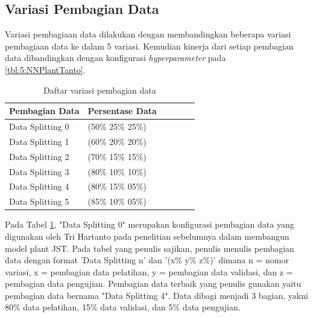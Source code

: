 
\subsection{Variasi Pembagian Data} 

Variasi pembagiaan data dilakukan dengan membandingkan beberapa variasi pembagiaan data ke dalam 5 variasi. Kemudian kinerja dari setiap pembagian data dibandingkan dengan konfigurasi \textit{hyperparameter} pada \ref{tbl:5:NNPlantTanto}.

\begin{table}[h!]
	\caption{Daftar variasi pembagian data}
	\label{tbl:5:DataSplitting}
	\centering
	\begin{tabular}{|p{3cm}|p{3cm}|p{1.5cm}|p{1cm}|p{1.5cm}|p{1cm}|}
		\hline
		Pembagian Data   & Persentase Data \\ \hline
		Data Splitting 0 & (50\% 25\% 25\%)\\ \hline
		Data Splitting 1 & (60\% 20\% 20\%)\\ \hline
		Data Splitting 2 & (70\% 15\% 15\%)\\ \hline
		Data Splitting 3 & (80\% 10\% 10\%)\\ \hline
		Data Splitting 4 & (80\% 15\% 05\%)\\ \hline
		Data Splitting 5 & (85\% 10\% 05\%)\\ \hline
	\end{tabular}
\end{table}

Pada Tabel \ref{tbl:5:DataSplitting}, "Data Splitting 0" merupakan konfigurasi pembagian data yang digunakan oleh Tri Hartanto pada penelitian sebelumnya dalam membangun model plant JST. Pada tabel yang penulis sajikan, penulis menulis pembagian data dengan format 'Data Splitting n' dan '(x\% y\% z\%)' dimana n = nomor variasi, x = pembagian data pelatihan, y = pembagian data validasi, dan z = pembagian data pengujian. Pembagian data terbaik yang penulis gunakan yaitu pembagian data bernama "Data Splitting 4". Data dibagi menjadi 3 bagian, yakni 80\% data pelatihan, 15\% data validasi, dan 5\% data pengujian.


